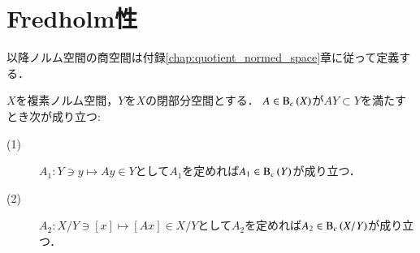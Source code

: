 \section{Fredholm性}
	
	以降ノルム空間の商空間は付録\ref{chap:quotient_normed_space}章に従って定義する．
	
	\begin{screen}
		\begin{lem}[商空間のコンパクト作用素]
			$X$を複素ノルム空間，$Y$を$X$の閉部分空間とする．
			$A \in \mathrm{B}_c\left(X\right) $が$AY \subset Y$を満たすとき次が成り立つ:
			\begin{description}
				\item[(1)] $A_1:Y \ni y \longmapsto A y \in Y$として$A_1$を定めれば$A_1 \in \mathrm{B}_c\left(Y\right) $が成り立つ．
				\item[(2)] $A_2:X/Y \ni [x] \longmapsto [Ax] \in X/Y$として$A_2$を定めれば$A_2 \in \mathrm{B}_c\left(X/Y\right) $が成り立つ．
			\end{description}
		\end{lem}
	\end{screen}
	
